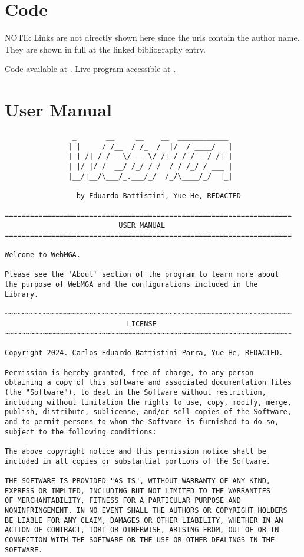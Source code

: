 \section{Code}
NOTE: Links are not directly shown here since the urls contain the author name. They are shown in full at the linked bibliography entry.

Code available at \cite{webmga_3_github}. Live program accessible at \cite{webmga_3_app}.

\section{User Manual}
\begin{verbatim}
                _       __     __    __  ____________
               | |     / /__  / /_  /  |/  / ____/   |
               | | /| / / _ \/ __ \/ /|_/ / / __/ /| |
               | |/ |/ /  __/ /_/ / /  / / /_/ / ___ |
               |__/|__/\___/_.___/_/  /_/\____/_/  |_|

                 by Eduardo Battistini, Yue He, REDACTED

====================================================================
                           USER MANUAL
====================================================================

Welcome to WebMGA.

Please see the 'About' section of the program to learn more about
the purpose of WebMGA and the configurations included in the
Library.

~~~~~~~~~~~~~~~~~~~~~~~~~~~~~~~~~~~~~~~~~~~~~~~~~~~~~~~~~~~~~~~~~~~~
                             LICENSE
~~~~~~~~~~~~~~~~~~~~~~~~~~~~~~~~~~~~~~~~~~~~~~~~~~~~~~~~~~~~~~~~~~~~

Copyright 2024. Carlos Eduardo Battistini Parra, Yue He, REDACTED.

Permission is hereby granted, free of charge, to any person
obtaining a copy of this software and associated documentation files
(the "Software"), to deal in the Software without restriction,
including without limitation the rights to use, copy, modify, merge,
publish, distribute, sublicense, and/or sell copies of the Software,
and to permit persons to whom the Software is furnished to do so,
subject to the following conditions:

The above copyright notice and this permission notice shall be
included in all copies or substantial portions of the Software.

THE SOFTWARE IS PROVIDED "AS IS", WITHOUT WARRANTY OF ANY KIND,
EXPRESS OR IMPLIED, INCLUDING BUT NOT LIMITED TO THE WARRANTIES
OF MERCHANTABILITY, FITNESS FOR A PARTICULAR PURPOSE AND
NONINFRINGEMENT. IN NO EVENT SHALL THE AUTHORS OR COPYRIGHT HOLDERS
BE LIABLE FOR ANY CLAIM, DAMAGES OR OTHER LIABILITY, WHETHER IN AN
ACTION OF CONTRACT, TORT OR OTHERWISE, ARISING FROM, OUT OF OR IN
CONNECTION WITH THE SOFTWARE OR THE USE OR OTHER DEALINGS IN THE
SOFTWARE.


\end{verbatim}

